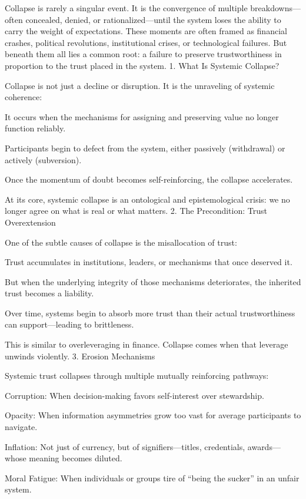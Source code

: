 \documentclass[11pt,oneside]{book}
\begin{document}
Collapse is rarely a singular event. It is the convergence of multiple breakdowns—often concealed, denied, or rationalized—until the system loses the ability to carry the weight of expectations. These moments are often framed as financial crashes, political revolutions, institutional crises, or technological failures. But beneath them all lies a common root: a failure to preserve trustworthiness in proportion to the trust placed in the system.
1. What Is Systemic Collapse?

Collapse is not just a decline or disruption. It is the unraveling of systemic coherence:

    It occurs when the mechanisms for assigning and preserving value no longer function reliably.

    Participants begin to defect from the system, either passively (withdrawal) or actively (subversion).

    Once the momentum of doubt becomes self-reinforcing, the collapse accelerates.

At its core, systemic collapse is an ontological and epistemological crisis: we no longer agree on what is real or what matters.
2. The Precondition: Trust Overextension

One of the subtle causes of collapse is the misallocation of trust:

    Trust accumulates in institutions, leaders, or mechanisms that once deserved it.

    But when the underlying integrity of those mechanisms deteriorates, the inherited trust becomes a liability.

    Over time, systems begin to absorb more trust than their actual trustworthiness can support—leading to brittleness.

This is similar to overleveraging in finance. Collapse comes when that leverage unwinds violently.
3. Erosion Mechanisms

Systemic trust collapses through multiple mutually reinforcing pathways:

    Corruption: When decision-making favors self-interest over stewardship.

    Opacity: When information asymmetries grow too vast for average participants to navigate.

    Inflation: Not just of currency, but of signifiers—titles, credentials, awards—whose meaning becomes diluted.

    Moral Fatigue: When individuals or groups tire of “being the sucker” in an unfair system.
\end{document}
